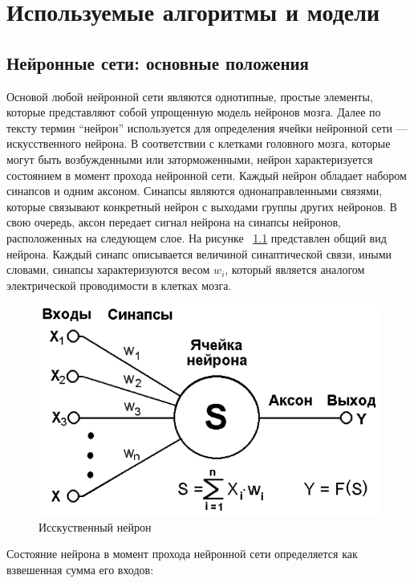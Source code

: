\documentclass[a4paper,english,russian]{G2-105}
\begin{document}
\chapter{Используемые алгоритмы и модели}
\section{Нейронные сети: основные положения}
\par Основой любой нейронной сети являются однотипные, простые элементы, которые представляют собой упрощенную модель нейронов мозга. Далее по тексту термин “нейрон” используется для определения ячейки нейронной сети --- искусственного нейрона. В соответствии с клетками головного мозга, которые могут быть возбужденными или заторможенными, нейрон характеризуется состоянием в момент прохода нейронной сети. Каждый нейрон обладает набором синапсов и одним аксоном. Синапсы являются однонаправленными связями, которые связывают конкретный нейрон с выходами группы других нейронов. В свою очередь, аксон передает сигнал нейрона на синапсы нейронов, расположенных на следующем слое. На рисунке ~\ref{neuron} представлен общий вид нейрона. Каждый синапс описывается величиной синаптической связи, иными словами, синапсы характеризуются весом $w_i$, который является аналогом электрической проводимости в клетках мозга.
\begin{figure}
    \includegraphics[width=0.6\linewidth]{neuron.png}
    \caption{Исскуственный нейрон}
	\label{neuron}
\end{figure}
\par Состояние нейрона в момент прохода нейронной сети определяется как взвешенная сумма его входов:
\end{document}

